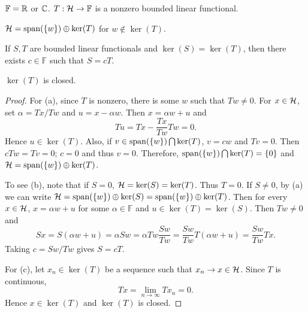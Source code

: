 \begin{proposition}\label{prop:bd_functional_on_h}
    $\mathbb{F} = \mathbb{R}$ or $\mathbb{C}$. $T:\mathcal{H}\to\mathbb{F}$ is a nonzero bounded 
    linear functional. 
    \begin{thmenum}
        \item $\mathcal{H} = \operatorname{span}(\left\{ {w} \right\})\oplus\ker(T)$ for $w\notin \ker(T)$.
        \item If $S,T$ are bounded linear functionals and $\ker(S) = \ker(T)$, 
        then there exists $c\in\mathbb{F}$ such that $S = cT$. 
        \item $\ker(T)$ is closed.
    \end{thmenum}
\end{proposition}
\begin{proof}
    For (a), since $T$ is nonzero, there is some $w$ such that $Tw\neq 0$. 
    For $x\in\mathcal{H}$, set $\alpha = Tx/Tw$ and $u = x - \alpha w$. Then 
    $x = \alpha w + u$ and 
    \begin{equation*}
        Tu = Tx - \frac{Tx}{Tw}Tw = 0.
    \end{equation*}
    Hence $u\in \ker(T)$. Also, if $v\in \operatorname{span}(\left\{ {w} \right\})\bigcap\ker(T)$, 
    $v = cw$ and $Tv = 0$. Then $cTw = Tv = 0$; $c = 0$ and thus $v = 0$. 
    Therefore, $\operatorname{span}(\left\{ {w} \right\})\bigcap\ker(T) = \left\{ {0} \right\}$ and 
    $\mathcal{H} = \operatorname{span}(\left\{ {w} \right\})\oplus\ker(T)$. 

    To see (b), note that if $S = 0$, $\mathcal{H} = \ker(S) = \ker(T)$. 
    Thus $T = 0$. If $S\neq 0$, by (a) we can write 
    $\mathcal{H} = \operatorname{span}(\left\{ {w} \right\})\oplus\ker(S) = \operatorname{span}(\left\{ {w} \right\})\oplus\ker(T)$. 
    Then for every $x\in\mathcal{H}$, $x = \alpha w + u$ for some $\alpha\in\mathbb{F}$ 
    and $u\in\ker(T)=\ker(S)$. Then $Tw\neq 0$ and
    \begin{equation*}
        Sx = S(\alpha w + u) = \alpha Sw = \alpha Tw\frac{Sw}{Tw} = \frac{Sw}{Tw}T(\alpha w + u) = \frac{Sw}{Tw}Tx.
    \end{equation*}
    Taking $c = Sw/Tw$ gives $S = cT$. 

    For (c), let $x_n\in\ker(T)$ be a sequence such that $x_n\to x\in\mathcal{H}$. 
    Since $T$ is continuous, 
    \begin{equation*}
        Tx = \lim_{n\to\infty} Tx_n = 0. 
    \end{equation*}
    Hence $x\in\ker(T)$ and $\ker(T)$ is closed.
\end{proof}

